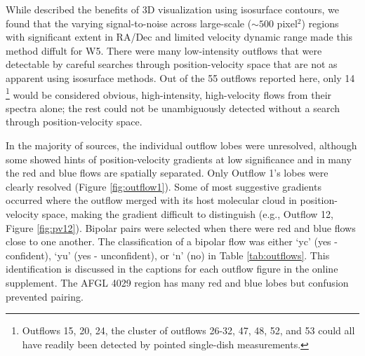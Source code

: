 While \citet{arce2010} described the benefits of 3D visualization using
isosurface contours, we found that the varying signal-to-noise across
large-scale ($\sim500$ pixel$^2$) regions with significant extent in RA/Dec and
limited velocity dynamic range made this method diffult for W5.  There
were many low-intensity outflows that were detectable by careful searches
through position-velocity space that are not as apparent using isosurface
methods.  Out of the 55 outflows reported here, only 14 \footnote{
Outflows 15, 20, 24, the cluster of outflows 26-32, 47, 48, 52, and 53 could 
all have readily been detected by pointed single-dish measurements.} would be
considered obvious, high-intensity, high-velocity flows from their spectra
alone; the rest could not be unambiguously detected without a search through
position-velocity space.

In the majority of sources, the individual outflow lobes were
unresolved, although some showed hints of position-velocity gradients at low
significance and in many the red and blue flows are spatially separated.    Only
Outflow 1's lobes were clearly resolved (Figure \ref{fig:outflow1}).  Some of
most suggestive gradients occurred where the outflow merged with its host
molecular cloud in position-velocity space, making the gradient difficult to
distinguish (e.g., Outflow 12, Figure \ref{fig:pv12}).  Bipolar pairs were
selected when there were red and blue flows close to one another.  The
classification of a bipolar flow was either `yc' (yes - confident), `yu' (yes -
unconfident), or `n' (no) in Table \ref{tab:outflows}.  This identification is
discussed in the captions for each outflow figure in the online
supplement. The AFGL 4029 region has many red and blue lobes but confusion
prevented pairing.  

